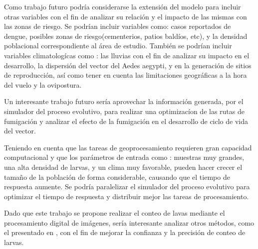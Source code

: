 Como trabajo futuro podría considerarse la extensión del modelo para incluir otras variables
con el fin de analizar su relación y el impacto de las mismas con las zonas de riesgo. Se podrían
incluir variables como: casos reportados de dengue, posibles zonas de riesgo(cementerios, patios
baldíos, etc), y la densidad poblacional correspondiente al área de estudio. También se podrían
incluir variables climatologícas como : las lluvias con el fin de analizar su impacto en el
desarrollo, la dispersión del vector del Aedes aegypti, y en la generación de sitios de
reproducción, así como tener en cuenta las limitaciones geográficas a la hora del vuelo y la
ovipostura.

Un interesante trabajo futuro sería aprovechar la información generada, por el simulador del
proceso evolutivo, para realizar una optimizacíon de las rutas de fumigación y analizar el efecto
de la fumigación en el desarrollo de ciclo de vida del vector.

Teniendo en cuenta que las tareas de geoprocesamiento requieren gran capacidad computacional y que
los parámetros de entrada como : muestras muy grandes, una alta densidad de larvas, y un
clima muy favorable, pueden hacer crecer el tamaño de la población de forma considerable, causando
que el tiempo de respuesta aumente. Se podría paralelizar el simulador del proceso evolutivo para
optimizar el tiempo de respuesta y distribuir mejor las tareas de procesamiento.

Dado que este trabajo se propone realizar el conteo de lavas mediante el procesamiento digital de
imágenes, sería interesante analizar otros métodos, como el presentado en
\cite{gonzalez2008segmentacion}, con el fin de mejorar la confianza y la precisión de conteo de
larvas.
